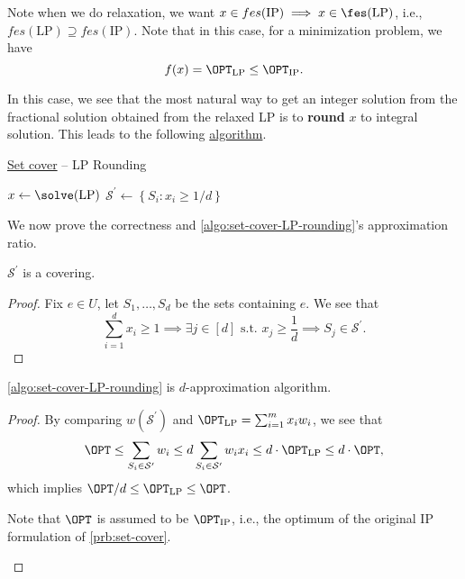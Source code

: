 \begin{note}
	Note when we do relaxation, we want \(x\in fes(\text{IP}) \implies x\in \fes(\text{LP})\), i.e., \(fes(\text{LP})\supseteq fes(\text{IP})\). Note that in this case, for a minimization problem, we have
	\[
		f(x) = \OPT_\text{LP} \leq \OPT_\text{IP}.
	\]
\end{note}

In this case, we see that the most natural way to get an integer solution from the fractional solution obtained from the relaxed LP is to \textbf{round} \(x\) to integral solution. This leads to the following \hyperref[algo:set-cover-LP-rounding]{algorithm}.

\begin{algorithm}[H]\label{algo:set-cover-LP-rounding}
	\DontPrintSemicolon
	\caption{\hyperref[prb:set-cover]{Set cover} -- LP Rounding}
	\BlankLine
	\(x\gets\solve(\text{LP})\)
	\(\mathcal{S} ^\prime \gets \left\{ S_i \colon x_{i} \geq 1 / d \right\}\)\;
	\;
\end{algorithm}

We now prove the correctness and \autoref{algo:set-cover-LP-rounding}'s approximation ratio.
\begin{lemma}
	\(\mathcal{S} ^\prime \) is a covering.
\end{lemma}
\begin{proof}
	Fix \(e\in U\), let \(S_1, \dots  , S_d\) be the sets containing \(e\). We see that
	\[
		\sum_{i=1}^{d} x_{i} \geq 1\implies \exists j\in[d] \text{ s.t. } x_j \geq \frac{1}{d} \implies S_j\in \mathcal{S} ^\prime.
	\]
\end{proof}

\begin{theorem}\label{thm:set-cover-LP-rounding}
	\autoref{algo:set-cover-LP-rounding} is \(d\)-approximation algorithm.
\end{theorem}
\begin{proof}
	By comparing \(w(\mathcal{S} ^\prime )\) and \(\OPT_\text{LP} = \sum_{i=1}^{m} x_{i} w_{i}\), we see that
	\[
		\OPT \leq \sum_{S_i\in \mathcal{S} ^\prime }w_i \leq d \sum_{S_i\in \mathcal{S} ^\prime }w_{i} x_{i} \leq d\cdot \OPT_\text{LP} \leq d\cdot \OPT,
	\]
	which implies \(\OPT / d\leq \OPT_\text{LP} \leq \OPT\).

	\begin{note}
		Note that \(\OPT\) is assumed to be \(\OPT_{\text{IP}}\), i.e., the optimum of the original IP formulation of \autoref{prb:set-cover}.
	\end{note}
\end{proof}

